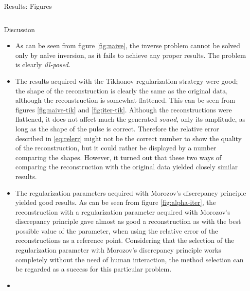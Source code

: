 \documentclass[final]{beamer}
\begin{document}
\begin{frame}[t]
\begin{columns}[t]
\begin{column}{.465\textwidth}
\begin{block}{Results: Figures}
\begin{columns}
\end{columns}


\end{block}


\begin{block}{Discussion}

\begin{itemize}

\item As can be seen from figure \ref{fig:naive}, the inverse problem cannot be solved only by naïve inversion, as it fails to achieve any proper results. The problem is clearly \emph{ill-posed}.

\item The results acquired with the Tikhonov regularization strategy were good; the shape of the reconstruction is clearly the same as the original data, although the reconstruction is somewhat flattened. This can be seen from figures \ref{fig:naive-tik} and \ref{fig:iter-tik}. Although the reconstructions were flattened, it does not affect much the generated \emph{sound}, only its amplitude, as long as the shape of the pulse is correct. Therefore the relative error described in \eqref{eq:relerr} might not be the correct number to show the quality of the reconstruction, but it could rather be displayed by a number comparing the shapes. However, it turned out that these two ways of comparing the reconstruction with the original data yielded closely similar results.

\item The regularization parameters acquired with Morozov's discrepancy principle yielded good results. As can be seen from figure \ref{fig:alpha-iter}, the reconstruction with a regularization parameter acquired with Morozov's discrepancy principle gave almost as good a reconstruction as with the best possible value of the parameter, when using the relative error of the reconstructions as a reference point. Considering that the selection of the regularization parameter with Morozov's discrepancy principle works completely without the need of human interaction, the method selection can be regarded as a success for this particular problem.

\item 


\end{itemize}
\end{block}
\end{column}
\end{columns}
\end{frame}
\end{document}
